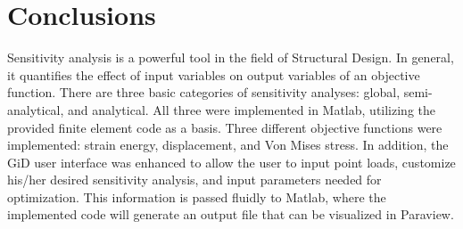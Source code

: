 
\section{Conclusions} %
Sensitivity analysis is a powerful tool in the field of Structural Design. In general, it quantifies the effect of input variables on output variables of an objective function. There are three basic categories of sensitivity analyses: global, semi-analytical, and analytical. All three were implemented in Matlab, utilizing the provided finite element code as a basis. Three different objective functions were implemented: strain energy, displacement, and Von Mises stress. In addition, the GiD user interface was enhanced to allow the user to input point loads, customize his/her desired sensitivity analysis, and input parameters needed for optimization. This information is passed fluidly to Matlab, where the implemented code will generate an output file that can be visualized in Paraview.
